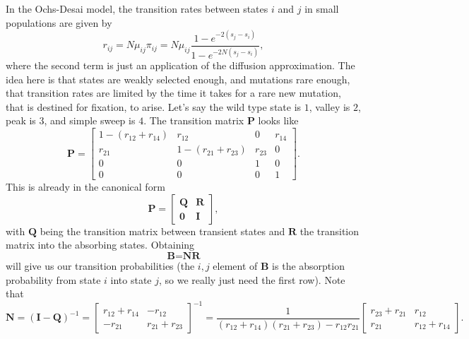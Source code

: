 \documentclass[11pt]{revtex4}
\begin{document}
In the Ochs-Desai model, the transition rates between states $i$ and $j$ in small populations are given by
\begin{equation}
r_{ij} = N\mu_{ij}\pi_{ij} = N\mu_{ij}\frac{1-e^{-2(s_j-s_i)}}{1-e^{-2N(s_j-s_i)}},
\end{equation}
where the second term is just an application of the diffusion approximation.
The idea here is that states are weakly selected enough, and mutations rare enough, that transition rates are limited by the time it takes for a rare new mutation, that is destined for fixation, to arise.
Let's say the wild type state is $1$, valley is $2$, peak is $3$, and simple sweep is $4$.
The transition matrix $\textbf{P}$ looks like
\begin{equation}
\textbf{P} =
\begin{bmatrix}
1-(r_{12} + r_{14}) & r_{12} & 0 & r_{14}  \\
r_{21} & 1 - (r_{21} + r_{23}) & r_{23} & 0 \\
0 & 0 & 1 & 0 \\
0 & 0 & 0 & 1
\end{bmatrix}.
\end{equation}
This is already in the canonical form
\begin{equation}
\textbf{P} =
\begin{bmatrix}
\textbf{Q} & \textbf{R} \\
\textbf{0} & \textbf{I}
\end{bmatrix},
\end{equation}
with $\textbf{Q}$ being the transition matrix between transient states and $\textbf{R}$ the transition matrix into the absorbing states.
Obtaining
\begin{equation}
\textbf{B} = \textbf{N}\textbf{R}
\end{equation}
will give us our transition probabilities (the $i, j$ element of \textbf{B} is the absorption probability from state $i$ into state $j$, so we really just need the first row).
Note that
\begin{equation}
\textbf{N} = (\textbf{I} - \textbf{Q})^{-1} =
\begin{bmatrix}
r_{12} + r_{14} & -r_{12}\\
-r_{21} & r_{21} + r_{23}
\end{bmatrix}^{-1} =
\frac{1}{(r_{12} + r_{14})(r_{21} + r_{23}) - r_{12}r_{21}}
\begin{bmatrix}
r_{23} + r_{21} & r_{12}\\
r_{21} & r_{12} + r_{14}
\end{bmatrix}.
\end{equation}
\end{document}
